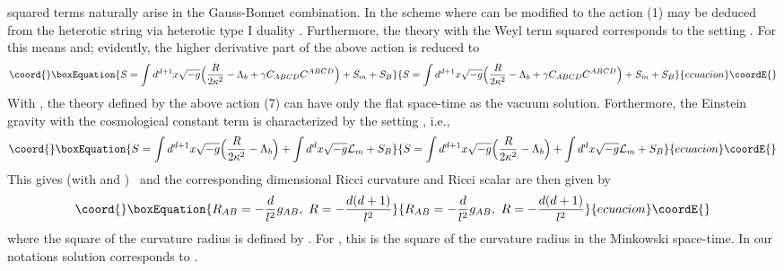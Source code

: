 \documentclass[a4paper,12pt]{article}
\begin{document}
squared terms naturally arise in the Gauss-Bonnet combination. 
In the scheme where \coordHE{} can be modified to \coordHE{} the 
action (1) may be deduced from the heterotic string via heterotic type
 I duality \cite{AAT,ESF}. Furthermore, the theory with the Weyl term squared 
corresponds to the setting \coordHE{}. 
For \coordHE{} this means \coordHE{} and; evidently, the higher derivative part of the 
above action is reduced to
\begin{equation}\coord{}\boxEquation{
S=\int d^{d+1}x \sqrt{-g}\Big(\frac{R}{2\kappa^2} -\Lambda_b+\gamma
 C_{ABCD} C^{ABCD}\Big)+S_m+S_B
}{
S=\int d^{d+1}x \sqrt{-g}\Big(\frac{R}{2\kappa^2} -\Lambda_b+\gamma
 C_{ABCD} C^{ABCD}\Big)+S_m+S_B
}{ecuacion}\coordE{}\end{equation}
With \coordHE{}, the theory defined by the above action (7) can have 
only the flat 
space-time as the vacuum solution. Forthermore, the 
 Einstein gravity with the cosmological constant term is characterized 
by the setting \coordHE{}, i.e.,
\begin{equation}\coord{}\boxEquation{
S=\int d^{d+1}x\sqrt{-g}\Big(\frac{R}{2\kappa^2}-\Lambda_b\Big)
+\int d^dx\sqrt{-g}{\cal L}_m+S_B
}{
S=\int d^{d+1}x\sqrt{-g}\Big(\frac{R}{2\kappa^2}-\Lambda_b\Big)
+\int d^dx\sqrt{-g}{\cal L}_m+S_B
}{ecuacion}\coordE{}\end{equation}
This gives (with \coordHE{} and \coordHE{})~\coordHE{} and the corresponding \coordHE{} dimensional Ricci 
curvature and Ricci scalar are then given by
\begin{equation}\coord{}\boxEquation{
R_{AB}= -\frac{d}{l^2}g_{AB},\,\, R=-\frac{d(d+1)}{l^2}
}{
R_{AB}= -\frac{d}{l^2}g_{AB},\,\, R=-\frac{d(d+1)}{l^2}
}{ecuacion}\coordE{}\end{equation}
where the square of the curvature radius is defined by 
\coordHE{}. For \coordHE{}, this is the square 
of the curvature radius in the Minkowski space-time. In our notations 
\coordHE{} solution corresponds to \coordHE{}.
\end{document}
